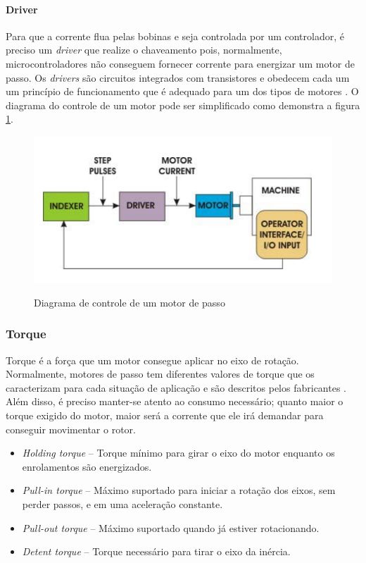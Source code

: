 \paragraph{Driver}

Para que a corrente flua pelas bobinas e seja controlada por um controlador, é preciso um \textit{driver} que realize o chaveamento pois, normalmente, microcontroladores não conseguem fornecer corrente para energizar um motor de passo. Os \textit{drivers} são circuitos integrados com transistores e obedecem cada um um princípio de funcionamento que é adequado para um dos tipos de motores \cite{man:advancedmicrosystemStepControl}. O diagrama do controle de um motor pode ser simplificado como demonstra a figura \ref{fig:connectionstepper}.


\begin{figure}[!htb]
	\centering
	\caption{Diagrama de controle de um motor de passo}
	\includegraphics[width=.7\linewidth]{figuras/connectionstepper}
	\label{fig:connectionstepper}
\end{figure}

\subsubsection{Torque}

Torque é a força que um motor consegue aplicar no eixo de rotação. Normalmente, motores de passo tem diferentes valores de torque que os caracterizam para cada situação de aplicação e são descritos pelos fabricantes \cite{manual:stepperMicrochip}. Além disso, é preciso manter-se atento ao consumo necessário; quanto maior o torque exigido do motor, maior será a corrente que ele irá demandar para conseguir movimentar o rotor.

\begin{itemize}
	\item \textit{Holding torque} – Torque mínimo para girar o eixo do motor enquanto os enrolamentos são energizados.
	\item \textit{Pull-in torque} – Máximo suportado para iniciar a rotação dos eixos, sem perder passos, e em uma aceleração constante.
	\item \textit{Pull-out torque} – Máximo suportado quando já estiver rotacionando.
	\item \textit{Detent torque} – Torque necessário para tirar o eixo da inércia.
\end{itemize}

